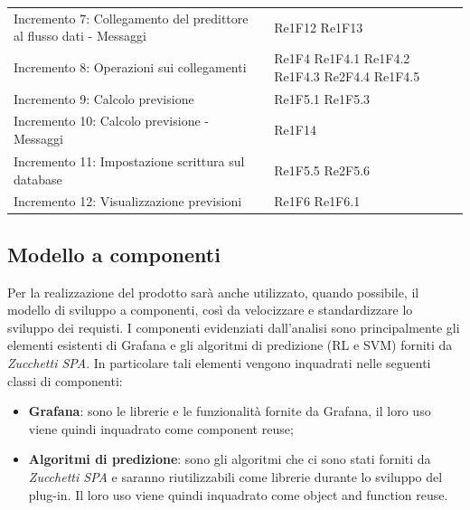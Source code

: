 \begin{longtable}{C{4cm} L{3cm}}
\\
Incremento 7: Collegamento del predittore al flusso dati - Messaggi &  Re1F12 \newline Re1F13
\\
Incremento 8: Operazioni sui collegamenti & Re1F4 \newline Re1F4.1 \newline Re1F4.2 \newline Re1F4.3 \newline Re2F4.4 \newline Re1F4.5
\\
Incremento 9: Calcolo previsione & Re1F5.1 \newline Re1F5.3
\\
Incremento 10: Calcolo previsione - Messaggi & Re1F14
\\
Incremento 11: Impostazione scrittura sul database & Re1F5.5 \newline  Re2F5.6
\\
Incremento 12: Visualizzazione previsioni & Re1F6 \newline Re1F6.1
\end{longtable}

\subsection{Modello a componenti}
Per la realizzazione del prodotto sarà anche utilizzato, quando possibile, il modello di sviluppo a componenti, così da velocizzare e standardizzare lo
sviluppo dei requisti. I componenti evidenziati dall’analisi sono principalmente
gli elementi esistenti di Grafana e gli algoritmi di predizione (RL e SVM) forniti
da \textit{Zucchetti SPA}. In particolare tali elementi vengono inquadrati nelle seguenti classi di componenti: \begin{itemize}
\item \textbf{Grafana}: sono le librerie e le funzionalità fornite da Grafana, il loro uso viene quindi inquadrato come component reuse;
\item \textbf{Algoritmi di predizione}: sono gli algoritmi che ci sono stati forniti da \textit{Zucchetti SPA} e saranno riutilizzabili come librerie durante lo sviluppo del plug-in. Il loro uso viene quindi inquadrato come object and
function reuse.
\end{itemize}